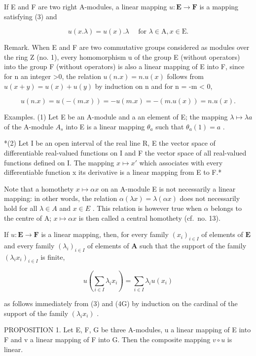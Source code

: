 If E and F are two right A-modules, a linear mapping \(u: \mathbf{E} \to \mathbf{F}\) is a mapping satisfying (3) and

\[
u (x . \lambda) = u (x). \lambda \quad \text { for } \lambda \in \mathrm{A}, x \in \mathrm{E}.\tag{4D}
\]

Remark. When E and F are two commutative groups considered as modules over the ring Z (no. 1), every homomorphism u of the group E (without operators) into the group F (without operators) is also a linear mapping of E into F, since for n an integer \textgreater0, the relation \(u(n.x) = n.u(x)\) follows from \(u(x + y) = u(x) + u(y)\) by induction on n and for n = -m \textless{} 0,

\[
u (n. x) = u (- (m. x)) = - u (m. x) = - (m. u (x)) = n. u (x).
\]

Examples. (1) Let E be an A-module and a an element of E; the mapping \(\lambda\mapsto\lambda a\) of the A-module \(A_{s}\) into E is a linear mapping \(\theta_{a}\) such that \(\theta_{a}(1)=a\) .

*(2) Let I be an open interval of the real line R, E the vector space of differentiable real-valued functions on I and F the vector space of all real-valued functions defined on I. The mapping \(x \mapsto x'\) which associates with every differentiable function x its derivative is a linear mapping from E to F.*

Note that a homothety \(x \mapsto \alpha x\) on an A-module E is not necessarily a linear mapping: in other words, the relation \(\alpha(\lambda x) = \lambda(\alpha x)\) does not necessarily hold for all \(\lambda \in A\) and \(x \in E\) . This relation is however true when \(\alpha\) belongs to the centre of A; \(x \mapsto \alpha x\) is then called a central homothety (cf.~no. 13).

If \(u: \mathbf{E} \to \mathbf{F}\) is a linear mapping, then, for every family \((x_{i})_{i \in I}\) of elements of \(\mathbf{E}\) and every family \((\lambda_{i})_{i \in I}\) of elements of \(\mathbf{A}\) such that the support of the family \((\lambda_{i}x_{i})_{i \in I}\) is finite,

\[
u \left(\sum_ {i \in I} \lambda_ {i} x _ {i}\right) = \sum_ {i \in I} \lambda_ {i} u (x _ {i})\tag{5}
\]

as follows immediately from (3) and (4G) by induction on the cardinal of the support of the family \((\lambda_{i}x_{i})\) .

PROPOSITION 1. Let E, F, G be three A-modules, u a linear mapping of E into F and v a linear mapping of F into G. Then the composite mapping \(v \circ u\) is linear.

